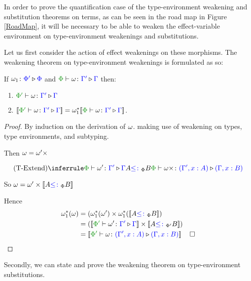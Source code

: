 In order to prove the quantification case of the type-environment weakening and substitution theorems on terms, as can be seen in the road map in Figure \ref{RoadMap}, it will be necessary to be able to weaken the effect-variable environment on type-environment weakenings and substitutions.

Let us first consider the action of effect weakenings on these morphisms. The weakening theorem on type-environment weakenings is formulated as so:



\begin{framed}
    \begin{theorem}\label{EffectWeakeningOnTermWeakening}
        If $\omega_1 \colon {\color{blue}\Phi'} \triangleright {\color {blue} \Phi}$ and $\pewrel{\w}{\G'}{\G}$ then:
        \begin{enumerate}[label=\roman*.]
            \item $\ewrel{\P'}{\w}{\G'}{\G}$
            \item $\deno{\ewrel{\P'}{\w}{\G'}{\G}} = \w_1\star\deno{\pewrel{\w}{\G'}{\G}}$.
        \end{enumerate} 
    \end{theorem}
    
    \begin{proof}
        By induction on the derivation of $\omega$. making use of weakening on types, type environments, and subtyping.
    
        \case{\textend}
        Then $\omega = \omega'\times$
        
        \begin{equation}
            \ntreeruleII{\textend}{\ewrel{\P}{\w'}{\G'}{\G}}{A\subtypep B}{\ewrel{\P}{\w\x}{(\G',x:A)}{(\G, x:B)}}
        \end{equation}
        
        So $\omega = \omega'\times{\bf [\![}A{\color{blue} \leq\colon}_\Phi B{\bf ]\!]}$
        
        Hence
        \begin{align*}
            \w_1\star(\w) &=(\w_1\star(\w')\times\w_1\star(\deno{A\subtypep B})\\
            & = (\deno{\ewrel{\P'}{\w'}{\G'}{\G}}\times\deno{A\subtypepp B})\\
            & = \deno{\ewrel{\P'}{\w}{(\G',x:A)}{(\G,x:B)}} & \square
        \end{align*}
    \end{proof}
\end{framed}


Secondly, we can state and prove the weakening theorem on type-environment substitutions.



